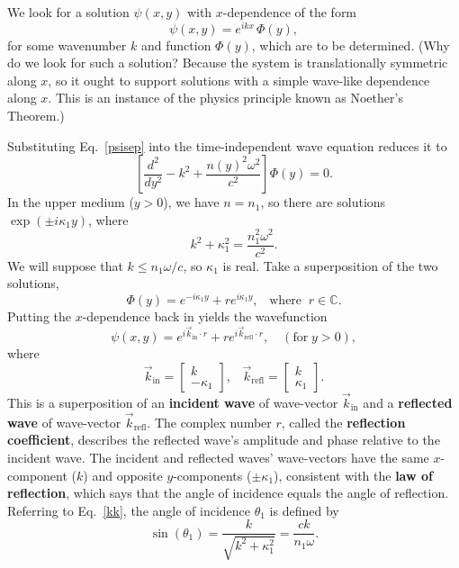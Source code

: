 \documentclass[10pt,a4paper]{article}
\begin{document}
We look for a solution $\psi(x,y)$ with $x$-dependence of the form
\begin{equation}
  \psi(x,y) = e^{ikx} \, \Phi(y),
  \label{psisep}
\end{equation}
for some wavenumber $k$ and function $\Phi(y)$, which are to be
determined.  (Why do we look for such a solution?  Because the system
is translationally symmetric along $x$, so it ought to support
solutions with a simple wave-like dependence along $x$.  This is an
instance of the physics principle known as Noether's Theorem.)

Substituting Eq.~\eqref{psisep} into the time-independent wave
equation reduces it to
\begin{equation}
  \left[\frac{d^2}{dy^2} - k^2 + \frac{n(y)^2 \omega^2}{c^2} \right]
  \Phi(y) = 0.
  \label{wave1dode}
\end{equation}
In the upper medium ($y > 0$), we have $n = n_1$, so there are
solutions $\exp(\pm i\kappa_1 y)$, where
\begin{equation}
  k^2 + \kappa_1^2 = \frac{n_1^2 \omega^2}{c^2}.
  \label{kk}
\end{equation}
We will suppose that $k \le n_1 \omega / c$, so $\kappa_1$ is real.
Take a superposition of the two solutions,
\begin{equation}
  \Phi(y) = e^{-i\kappa_1 y} + r e^{i\kappa_1 y}, \;\;\; \mathrm{where}\;\;
  r \in \mathbb{C}.
\end{equation}
Putting the $x$-dependence back in yields the wavefunction
\begin{equation}
  \psi(x,y) = e^{i\vec{k}_{\mathrm{in}}\cdot r}
  + r e^{i\vec{k}_{\textrm{refl}}\cdot r}, \quad(\textrm{for} \; y > 0),
\end{equation}
where
\begin{equation}
  \vec{k}_{\textrm{in}} = \begin{bmatrix}k \\ -\kappa_1 \end{bmatrix}, \;\;\;
  \vec{k}_{\textrm{refl}} = \begin{bmatrix}k \\ \kappa_1 \end{bmatrix}.
\end{equation}
This is a superposition of an \textbf{incident wave} of wave-vector
$\vec{k}_{\textrm{in}}$ and a \textbf{reflected wave} of wave-vector
$\vec{k}_{\textrm{refl}}$.  The complex number $r$, called the
\textbf{reflection coefficient}, describes the reflected wave's
amplitude and phase relative to the incident wave.  The incident and
reflected waves' wave-vectors have the same $x$-component ($k$) and
opposite $y$-components ($\pm \kappa_1$), consistent with the
\textbf{law of reflection}, which says that the angle of incidence
equals the angle of reflection.  Referring to Eq.~\eqref{kk}, the
angle of incidence $\theta_1$ is defined by
\begin{equation}
  \sin(\theta_1) = \frac{k}{\sqrt{k^2+\kappa_1^2}} = \frac{ck}{n_1\omega}.
  \label{sintheta1}
\end{equation}
\end{document}
